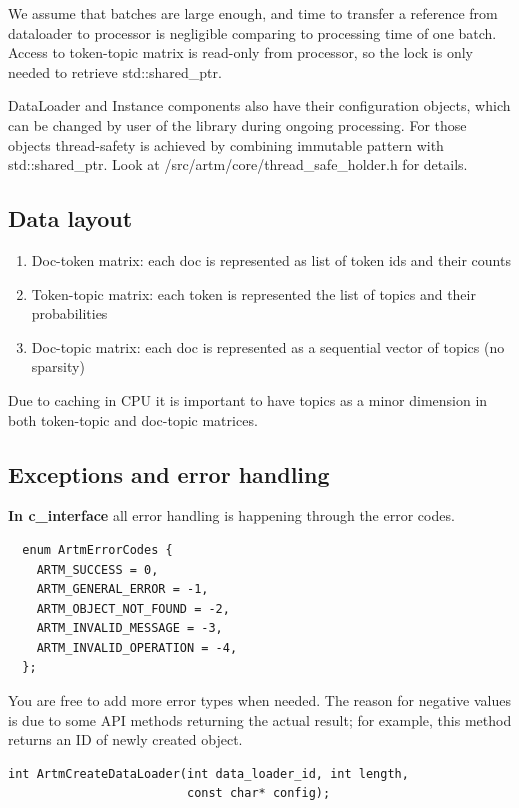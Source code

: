 \documentclass[11pt,a4paper,twoside]{report}
\begin{document}
We assume that batches are large enough,
and time to transfer a reference from dataloader to processor
is negligible comparing to processing time of one batch.
Access to token-topic matrix is read-only from processor,
so the lock is only needed to retrieve std::shared\_ptr.

DataLoader and Instance components also have their configuration objects,
which can be changed by user of the library during ongoing processing.
For those objects thread-safety is achieved by combining immutable pattern with std::shared\_ptr.
Look at /src/artm/core/thread\_safe\_holder.h for details.

\subsection{Data layout}
\begin{enumerate}
    \item Doc-token matrix: each doc is represented as list of token ids and their counts
    \item Token-topic matrix: each token is represented the list of topics and their probabilities
    \item Doc-topic matrix: each doc is represented as a sequential vector of topics (no sparsity)
\end{enumerate}

Due to caching in CPU it is important to have topics as a minor dimension in both token-topic and doc-topic matrices.

\subsection{Exceptions and error handling}

\textbf{In c\_interface} all error handling is happening through the error codes.
\begin{verbatim}
  enum ArtmErrorCodes {
    ARTM_SUCCESS = 0,
    ARTM_GENERAL_ERROR = -1,
    ARTM_OBJECT_NOT_FOUND = -2,
    ARTM_INVALID_MESSAGE = -3,
    ARTM_INVALID_OPERATION = -4,
  };
\end{verbatim}
You are free to add more error types when needed.
The reason for negative values is due to some API methods
returning the actual result; for example, this method returns an ID of newly created object.
\begin{verbatim}
int ArtmCreateDataLoader(int data_loader_id, int length,
                         const char* config);
\end{verbatim}
\end{document}
